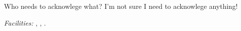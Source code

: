 \documentclass[manuscript]{aastex}
\begin{document}


\acknowledgments

Who needs to acknowlege what? I'm not sure I need to acknowlege anything!



{\it Facilities:} , , .


\end{document}
